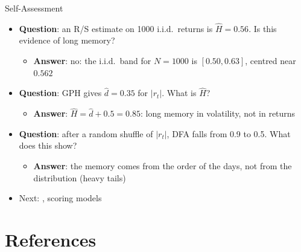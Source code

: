 \begin{frame}{Self-Assessment}
\itemsize{\footnotesize}
\begin{itemize}
    \item \textbf{Question}: an R/S estimate on 1000 i.i.d.\ returns is $\hat H = 0.56$. Is this evidence of long memory?
    \begin{itemize}
        \item \textbf{Answer}: no: the i.i.d.\ band for $N = 1000$ is $[0.50, 0.63]$, centred near $0.562$
    \end{itemize}
    \item \textbf{Question}: GPH gives $\hat d = 0.35$ for $|r_t|$. What is $\hat H$?
    \begin{itemize}
        \item \textbf{Answer}: $\hat H = \hat d + 0.5 = 0.85$: long memory in volatility, not in returns
    \end{itemize}
    \item \textbf{Question}: after a random shuffle of $|r_t|$, DFA falls from 0.9 to 0.5. What does this show?
    \begin{itemize}
        \item \textbf{Answer}: the memory comes from the order of the days, not from the distribution (heavy tails)
    \end{itemize}
    \item Next: , scoring models
\end{itemize}
\end{frame}


\section{References}

